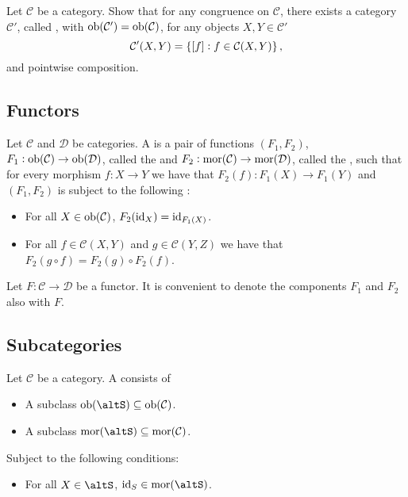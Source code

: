 \begin{exercise}
	Let $\mathcal{C}$ be a category. Show that for any congruence on $\mathcal{C}$, there exists a category $\mathcal{C}'$, called , with $\operatorname{ob}(\mathcal{C}') = \operatorname{ob}(\mathcal{C})$, for any objects $X,Y \in \mathcal{C}'$
	\begin{equation*}
		\mathcal{C}'(X,Y) = \cbr[0]{\sbr[0]{f} : f \in \mathcal{C}(X,Y)},
	\end{equation*}
	\noindent and pointwise composition.
\end{exercise}

\subsection*{Functors}

\begin{definition}[Functor]
	Let $\mathcal{C}$ and $\mathcal{D}$ be categories. A  is a pair of functions $(F_1,F_2)$, $F_1 : \operatorname{ob}(\mathcal{C}) \to \operatorname{ob}(\mathcal{D})$, called the  and $F_2 : \operatorname{mor}(\mathcal{C}) \to \operatorname{mor}(\mathcal{D})$, called the , such that for every morphism $f : X \to Y$ we have that $F_2(f) : F_1(X) \to F_1(Y)$ and $(F_1,F_2)$ is subject to the following :
	\begin{itemize}[leftmargin = *]
		\item For all $X \in \operatorname{ob}(\mathcal{C})$, $F_2(\operatorname{id}_X) = \operatorname{id}_{F_1(X)}$.
		\item For all $f \in \mathcal{C}(X,Y)$ and $g \in \mathcal{C}(Y,Z)$ we have that $F_2(g \circ f) = F_2(g) \circ F_2(f)$.
	\end{itemize}
\end{definition}

\begin{remark}
	Let $F : \mathcal{C} \to \mathcal{D}$ be a functor. It is convenient to denote the components $F_1$ and $F_2$ also with $F$.
\end{remark}

\subsection*{Subcategories}
\begin{definition}[Subcategory]
	Let $\mathcal{C}$ be a category. A  consists of
	\begin{itemize}[leftmargin = *]
		\item A subclass $\ob(\mathcal{\altS}) \subseteq \ob(\mathcal{C})$.
		\item A subclass $\mor(\mathcal{\altS}) \subseteq \mor(\mathcal{C})$.
	\end{itemize}
	Subject to the following conditions:
	\begin{itemize}[leftmargin = *]
		\item For all $X \in \mathcal{\altS}$, $\id_S \in \mor(\mathcal{\altS})$.
	\end{itemize}
\end{definition}

